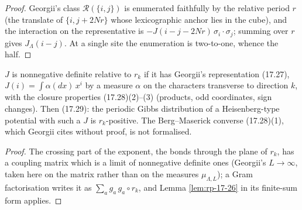 \begin{proof}
    \leanok
    Georgii's class $\mathcal R(\{i,j\})$ is enumerated faithfully by the relative period $r$
    (the translate of $\{i, j + 2Nr\}$ whose lexicographic anchor lies in the cube), and the
    interaction on the representative is $-J(i-j-2Nr)\,\sigma_i\cdot\sigma_j$; summing over $r$
    gives $J_\Lambda(i-j)$. At a single site the enumeration is two-to-one, whence the half.
\end{proof}

\begin{theorem}[Georgii (17.27)--(17.29)]
    \label{thm:rp-17-29}
    \leanok

    $J$ is nonnegative definite relative to $r_k$ if it has Georgii's representation (17.27),
    $J(i) = \int \alpha(dx)\,x^{i}$ by a measure $\alpha$ on the characters transverse to direction $k$,
    with the closure properties (17.28)(2)--(3) (products, odd coordinates, sign changes). Then
    (17.29): the periodic Gibbs distribution of a Heisenberg-type potential with such a $J$ is
    $r_k$-positive. The Berg--Maserick converse (17.28)(1), which Georgii cites without proof, is
    not formalised.
\end{theorem}
\begin{proof}
    \leanok
    The crossing part of the exponent, the bonds through the plane of $r_k$, has a coupling
    matrix which is a limit of nonnegative definite ones (Georgii's $L \to \infty$, taken here on
    the matrix rather than on the measures $\mu_{\Lambda,L}$); a Gram factorisation writes it as
    $\sum_a g_a\,g_a\circ r_k$, and Lemma \ref{lem:rp-17-26} in its finite-sum form applies.
\end{proof}

